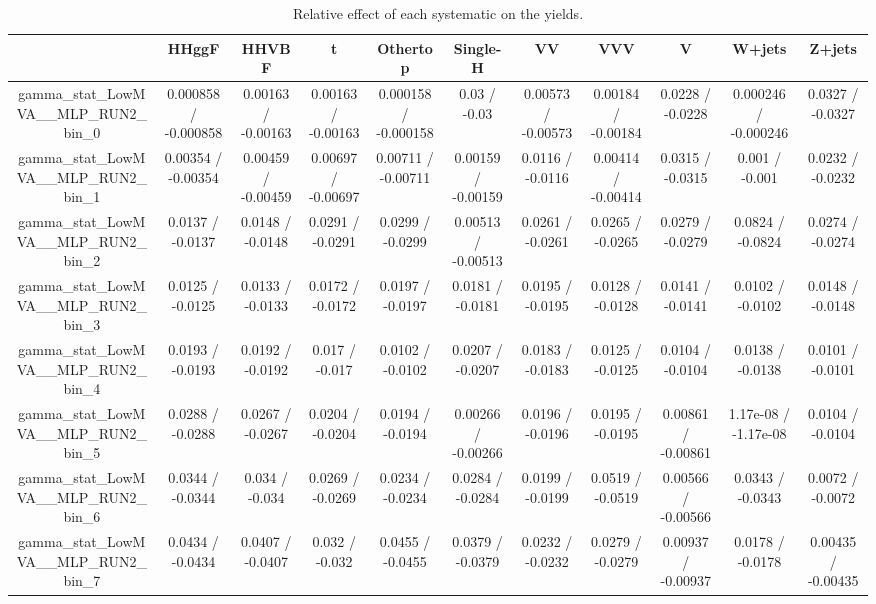 \documentclass[10pt]{article}
\begin{document}
\begin{table}[htbp]
\begin{center}
\begin{tabular}{|c|c|c|c|c|c|c|c|c|c|c|}
\hline 
      & HHggF      & HHVBF      & t      & Othertop      & Single-H      & VV      & VVV      & V      & W+jets      & Z+jets \\ 
\hline 
  gamma_stat_LowMVA__MLP_RUN2_bin_0 & 0.000858 / -0.000858 & 0.00163 / -0.00163 & 0.00163 / -0.00163 & 0.000158 / -0.000158 & 0.03 / -0.03 & 0.00573 / -0.00573 & 0.00184 / -0.00184 & 0.0228 / -0.0228 & 0.000246 / -0.000246 & 0.0327 / -0.0327 \\ 
  gamma_stat_LowMVA__MLP_RUN2_bin_1 & 0.00354 / -0.00354 & 0.00459 / -0.00459 & 0.00697 / -0.00697 & 0.00711 / -0.00711 & 0.00159 / -0.00159 & 0.0116 / -0.0116 & 0.00414 / -0.00414 & 0.0315 / -0.0315 & 0.001 / -0.001 & 0.0232 / -0.0232 \\ 
  gamma_stat_LowMVA__MLP_RUN2_bin_2 & 0.0137 / -0.0137 & 0.0148 / -0.0148 & 0.0291 / -0.0291 & 0.0299 / -0.0299 & 0.00513 / -0.00513 & 0.0261 / -0.0261 & 0.0265 / -0.0265 & 0.0279 / -0.0279 & 0.0824 / -0.0824 & 0.0274 / -0.0274 \\ 
  gamma_stat_LowMVA__MLP_RUN2_bin_3 & 0.0125 / -0.0125 & 0.0133 / -0.0133 & 0.0172 / -0.0172 & 0.0197 / -0.0197 & 0.0181 / -0.0181 & 0.0195 / -0.0195 & 0.0128 / -0.0128 & 0.0141 / -0.0141 & 0.0102 / -0.0102 & 0.0148 / -0.0148 \\ 
  gamma_stat_LowMVA__MLP_RUN2_bin_4 & 0.0193 / -0.0193 & 0.0192 / -0.0192 & 0.017 / -0.017 & 0.0102 / -0.0102 & 0.0207 / -0.0207 & 0.0183 / -0.0183 & 0.0125 / -0.0125 & 0.0104 / -0.0104 & 0.0138 / -0.0138 & 0.0101 / -0.0101 \\ 
  gamma_stat_LowMVA__MLP_RUN2_bin_5 & 0.0288 / -0.0288 & 0.0267 / -0.0267 & 0.0204 / -0.0204 & 0.0194 / -0.0194 & 0.00266 / -0.00266 & 0.0196 / -0.0196 & 0.0195 / -0.0195 & 0.00861 / -0.00861 & 1.17e-08 / -1.17e-08 & 0.0104 / -0.0104 \\ 
  gamma_stat_LowMVA__MLP_RUN2_bin_6 & 0.0344 / -0.0344 & 0.034 / -0.034 & 0.0269 / -0.0269 & 0.0234 / -0.0234 & 0.0284 / -0.0284 & 0.0199 / -0.0199 & 0.0519 / -0.0519 & 0.00566 / -0.00566 & 0.0343 / -0.0343 & 0.0072 / -0.0072 \\ 
  gamma_stat_LowMVA__MLP_RUN2_bin_7 & 0.0434 / -0.0434 & 0.0407 / -0.0407 & 0.032 / -0.032 & 0.0455 / -0.0455 & 0.0379 / -0.0379 & 0.0232 / -0.0232 & 0.0279 / -0.0279 & 0.00937 / -0.00937 & 0.0178 / -0.0178 & 0.00435 / -0.00435 \\ 
\hline 
\end{tabular} 
\caption{Relative effect of each systematic on the yields.} 
\end{center} 
\end{table} 
\end{document}

